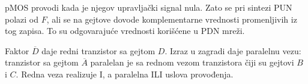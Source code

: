 pMOS provodi kada je njegov upravljački signal nula. Zato se pri sintezi PUN polazi od $F$, ali se na gejtove dovode komplementarne vrednosti promenljivih iz tog zapisa. To su odgovarajuće vrednosti korišćene u PDN mreži.

Faktor $\overline D$ daje redni tranzistor sa gejtom $D$. Izraz u zagradi daje paralelnu vezu: tranzistor sa gejtom $\overline A$ paralelan je sa rednom vezom tranzistora čiji su gejtovi $B$ i $C$. Redna veza realizuje I, a paralelna ILI uslova provođenja.
